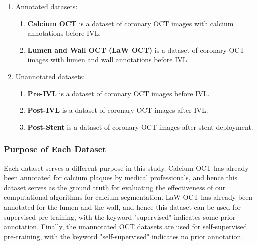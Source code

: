 \documentclass[a4paper,11pt,oneside]{report}
\begin{document}
\begin{enumerate}
    \item Annotated datasets:
    \begin{enumerate}
        \item \label{enum:calcium-dataset} \textbf{Calcium OCT} is a dataset of coronary OCT images with calcium annotations before IVL.
        \item \label{enum:lumen-and-wall-dataset} \textbf{Lumen and Wall OCT (LaW OCT)} is a dataset of coronary OCT images with lumen and wall annotations before IVL.
    \end{enumerate}
    \item \label{enum:unannotated-dataset} Unannotated datasets:
    \begin{enumerate}
        \item \textbf{Pre-IVL} is a dataset of coronary OCT images before IVL.
        \item \textbf{Post-IVL} is a dataset of coronary OCT images after IVL.
        \item \textbf{Post-Stent} is a dataset of coronary OCT images after stent deployment.
    \end{enumerate}
\end{enumerate}

\subsubsection{Purpose of Each Dataset}

Each dataset serves a different purpose in this study. Calcium OCT has already been annotated for calcium plaques by medical professionals, and hence this dataset serves as the ground truth for evaluating the effectiveness of our computational algorithms for calcium segmentation. LaW OCT has already been annotated for the lumen and the wall, and hence this dataset can be used for supervised pre-training, with the keyword "supervised" indicates some prior annotation. Finally, the unannotated OCT datasets are used for self-supervised pre-training, with the keyword "self-supervised" indicates no prior annotation. 
\end{document}
